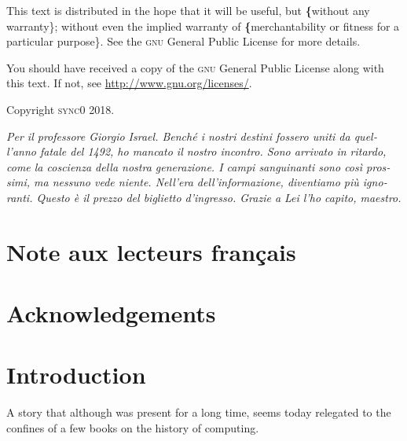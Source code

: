 \documentclass[version=last,draft=true,paper=A4,portrait,twoside=true,twocolumn=false,headinclude=false,footinclude=false,fontsize=11,BCOR=15mm,DIV=calc,pagesize=auto,titlepage=firstiscover,mpinclude=true,open=right,chapterprefix=true,numbers=autoendperiod,headsepline=false,parskip=false]{scrbook}
\begin{document}
This text is distributed in the hope that it will be useful, but \textbf\{without
any warranty\}; without even the implied warranty of \textbf\{merchantability or 
fitness for a particular purpose\}. See the \textsc{gnu} General 
Public License for more details.

You should have received a copy of the \textsc{gnu} General Public License along
with this text. If not, see \url{http://www.gnu.org/licenses/}.

\vspace{1\baselineskip}
\noindent
Copyright \textcopyright \textsc{sync0} 2018. 

\newpage 
\begin{FlushRight}
\begin{italian}
\textit{Per il professore Giorgio Israel. \newline Benché i nostri destini fossero uniti da quell'anno fatale del 1492, \linebreak ho mancato il nostro incontro. \linebreak Sono arrivato in ritardo, come la coscienza della nostra generazione. \linebreak I campi sanguinanti sono così prossimi, \linebreak ma nessuno vede niente. \linebreak Nell'era dell'informazione, diventiamo più ignoranti. \linebreak Questo è il prezzo del biglietto d'ingresso. \linebreak Grazie a Lei l'ho capito, maestro.}
\end{italian}
\end{FlushRight}

\newpage
\tableofcontents 

\frontmatter
\pagestyle{plain}
\chapter{Note aux lecteurs français} 
\lipsum
\chapter{Acknowledgements} 
\lipsum

\chapter{Introduction} 

A story that although was present for a long time, seems today relegated to
the confines of a few books on the history of computing. 
\end{document}
